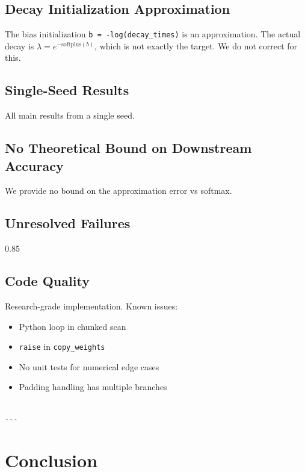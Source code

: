 \subsection{Decay Initialization Approximation}

The bias initialization \texttt{b = -log(decay\_times)} is an approximation. The 
actual decay is $\lambda = e^{-\text{softplus}(b)}$, which is not exactly 
the target. We do not correct for this.

\subsection{Single-Seed Results}

All main results from a single seed.

\subsection{No Theoretical Bound on Downstream Accuracy}

We provide no bound on the approximation error vs softmax.

\subsection{Unresolved Failures}

0.85

\subsection{Code Quality}

Research-grade implementation. Known issues:
\begin{itemize}
\item Python loop in chunked scan
\item \texttt{raise} in \texttt{copy\_weights}
\item No unit tests for numerical edge cases
\item Padding handling has multiple branches
\end{itemize}
\begin{lstlisting}

---
\end{lstlisting}


\section{Conclusion}

